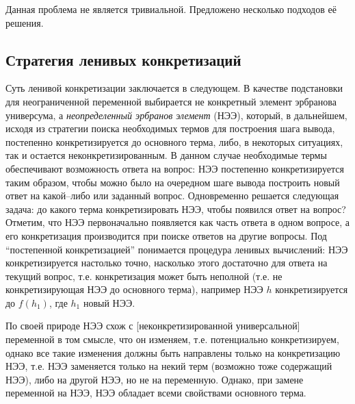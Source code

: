 Данная проблема не является тривиальной. Предложено несколько подходов её решения.

\subsection{Стратегия ленивых конкретизаций}
Суть ленивой конкретизации заключается в следующем. В качестве подстановки для неограниченной переменной выбирается не конкретный элемент эрбранова универсума, а {\em неопределенный эрбранов элемент} (НЭЭ), который, в дальнейшем, исходя из стратегии поиска необходимых термов для построения шага вывода, постепенно конкретизируется до основного терма, либо, в некоторых ситуациях, так и остается неконкретизированным. В данном случае необходимые термы обеспечивают возможность ответа на вопрос: НЭЭ постепенно конкретизируется таким образом, чтобы можно было на очередном шаге вывода построить новый ответ на какой--либо или заданный вопрос. Одновременно решается следующая задача: до какого терма конкретизировать НЭЭ, чтобы появился ответ на вопрос? Отметим, что НЭЭ первоначально появляется как часть ответа в одном вопросе, а его конкретизация производится при поиске ответов на другие вопросы. Под ``постепенной конкретизацией'' понимается процедура ленивых вычислений: НЭЭ конкретизируется настолько точно, насколько этого достаточно для ответа на текущий вопрос, т.е. конкретизация может быть неполной (т.е. не конкретизирующая НЭЭ до основного терма), например НЭЭ $h$ конкретизируется до $f(h_1)$, где $h_1$ новый НЭЭ.

По своей природе НЭЭ схож с [неконкретизированной универсальной] переменной в том смысле, что он изменяем, т.е. потенциально конкретизируем, однако все такие изменения должны быть направлены только на конкретизацию НЭЭ, т.е. НЭЭ заменяется только на некий терм (возможно тоже содержащий НЭЭ), либо на другой НЭЭ, но не на переменную. Однако, при замене переменной на НЭЭ, НЭЭ обладает всеми свойствами основного терма.

